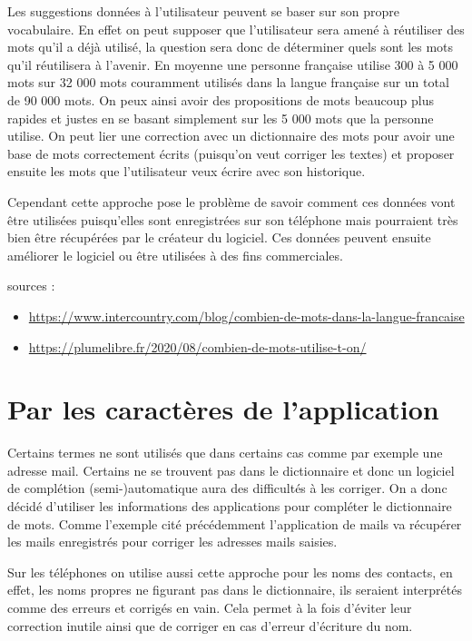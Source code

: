 \documentclass[final, 10pt]{report}
\begin{document}
    Les suggestions données à l'utilisateur peuvent se baser sur son propre vocabulaire. En effet on peut supposer que l'utilisateur sera amené à réutiliser des mots qu'il a déjà utilisé, la question sera donc de déterminer quels sont les mots qu'il réutilisera à l'avenir.
    En moyenne une personne française utilise 300 à 5 000 mots\cite{admin6658_combien_2020} sur 32 000 mots couramment utilisés\cite{noauthor_combien_nodate} dans la langue française sur un total de 90 000 mots.
    On peux ainsi avoir des propositions de mots beaucoup plus rapides et justes en se basant simplement sur les 5 000 mots que la personne utilise.
    On peut lier une correction avec un dictionnaire des mots pour avoir une base de mots correctement écrits (puisqu'on veut corriger les textes) et proposer ensuite les mots que l'utilisateur veux écrire avec son historique.
    
    Cependant cette approche pose le problème de savoir comment ces données vont être utilisées puisqu'elles sont enregistrées sur son téléphone mais pourraient très bien être récupérées par le créateur du logiciel.
    Ces données peuvent ensuite améliorer le logiciel ou être utilisées à des fins commerciales.
    
    \footnotesize
    sources :
    \begin{itemize}
        \item \url{https://www.intercountry.com/blog/combien-de-mots-dans-la-langue-francaise}
        \item \url{https://plumelibre.fr/2020/08/combien-de-mots-utilise-t-on/}
    \end{itemize}
    \normalsize

\section{Par les caractères de l'application}

    Certains termes ne sont utilisés que dans certains cas comme par exemple une adresse mail.
    Certains ne se trouvent pas dans le dictionnaire et donc un logiciel de complétion (semi-)automatique aura des difficultés à les corriger.
    On a donc décidé d'utiliser les informations des applications pour compléter le dictionnaire de mots.
    Comme l'exemple cité précédemment l'application de mails va récupérer les mails enregistrés pour corriger les adresses mails saisies.
    
    Sur les téléphones on utilise aussi cette approche pour les noms des contacts, en effet, les noms propres ne figurant pas dans le dictionnaire, ils seraient interprétés comme des erreurs et corrigés en vain. Cela permet à la fois d'éviter leur correction inutile ainsi que de corriger en cas d'erreur d'écriture du nom.
    
\end{document}
